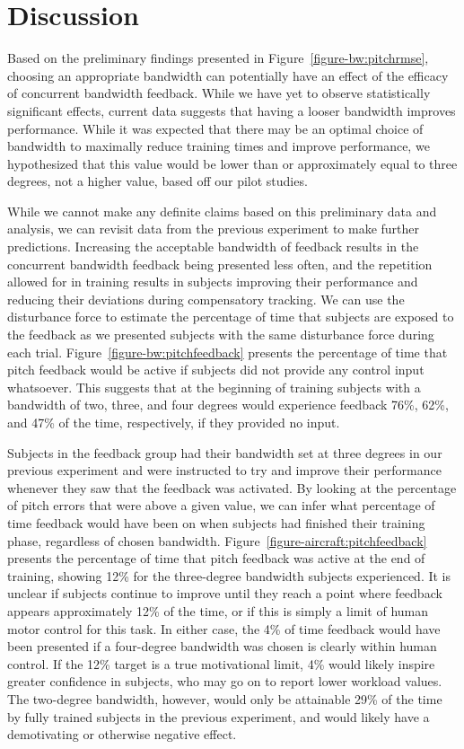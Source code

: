 \section{Discussion}

Based on the preliminary findings presented in Figure~\ref{figure-bw:pitchrmse}, choosing an appropriate bandwidth can potentially have an effect of the efficacy of concurrent bandwidth feedback.
While we have yet to observe statistically significant effects, current data suggests that having a looser bandwidth improves performance.
While it was expected that there may be an optimal choice of bandwidth to maximally reduce training times and improve performance, we hypothesized that this value would be lower than or approximately equal to three degrees, not a higher value, based off our pilot studies.

While we cannot make any definite claims based on this preliminary data and analysis, we can revisit data from the previous experiment to make further predictions.
Increasing the acceptable bandwidth of feedback results in the concurrent bandwidth feedback being presented less often, and the repetition allowed for in training results in subjects improving their performance and reducing their deviations during compensatory tracking.
We can use the disturbance force to estimate the percentage of time that subjects are exposed to the feedback as we presented subjects with the same disturbance force during each trial.
Figure~\ref{figure-bw:pitchfeedback} presents the percentage of time that pitch feedback would be active if subjects did not provide any control input whatsoever.
This suggests that at the beginning of training subjects with a bandwidth of two, three, and four degrees would experience feedback 76\%, 62\%, and 47\% of the time, respectively, if they provided no input.

Subjects in the feedback group had their bandwidth set at three degrees in our previous experiment and were instructed to try and improve their performance whenever they saw that the feedback was activated.
By looking at the percentage of pitch errors that were above a given value, we can infer what percentage of time feedback would have been on when subjects had finished their training phase, regardless of chosen bandwidth.
Figure~\ref{figure-aircraft:pitchfeedback} presents the percentage of time that pitch feedback was active at the end of training, showing 12\% for the three-degree bandwidth subjects experienced.
It is unclear if subjects continue to improve until they reach a point where feedback appears approximately 12\% of the time, or if this is simply a limit of human motor control for this task.
In either case, the 4\% of time feedback would have been presented if a four-degree bandwidth was chosen is clearly within human control.
If the 12\% target is a true motivational limit, 4\% would likely inspire greater confidence in subjects, who may go on to report lower workload values.
The two-degree bandwidth, however, would only be attainable 29\% of the time by fully trained subjects in the previous experiment, and would likely have a demotivating or otherwise negative effect.

